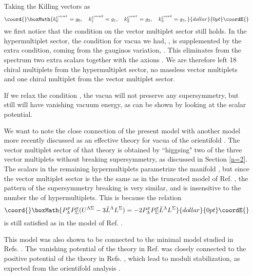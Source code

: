 \documentclass[a4paper,12pt]{article}
\begin{document}
Taking the Killing vectors as
$$\coord{}\boxMath{k^{C^{m=1}}_0 =g_0, \quad k^{C^{m=2}}_1 =g_1, \quad k^{C^{a=1}}_2 =g_2, \quad k^{C^{a=2}}_3
=g_3,}{dollar}{0pt}\coordE{}$$ we first notice that the condition on the vector multiplet
sector \coordHE{} still holds. In
the hypermultiplet sector, the condition for \coordHE{} vacua we had,
\coordHE{}, is supplemented by the extra condition, coming
from the gauginos variation, \coordHE{}. This eliminates from
the spectrum two extra scalars \coordHE{} together with the
axions \coordHE{}. We are therefore left 18 chiral multiplets
from the hypermultiplet sector, no massless vector multiplets and
one chiral multiplet from the \coordHE{} vector multiplet sector.

If we relax the condition \coordHE{}, the vacua will not
preserve any supersymmetry, but still will have vanishing vacuum
energy, as can be shown by looking at the scalar potential.

We want to note the close connection of the present \coordHE{} model
with another \coordHE{} model more recently discussed as an effective
theory for \coordHE{} vacua of the \coordHE{} orientifold
\cite{adflq}. The vector multiplet sector of that theory is
obtained by ``higgsing" two of the three vector multiplets without
breaking \coordHE{} supersymmetry, as discussed in Section \ref{n=2}.
The scalars in the remaining hypermultiplets parametrize the
manifold \coordHE{}, but since the
vector multiplet sector is the the same as in the \coordHE{}
truncated model of Ref. \cite{adflq}, the pattern of the
supersymmetry breaking is very similar, and is insensitive to the
number the of hypermultiplets. This is because the relation
$$\coord{}\boxMath{P_\Lambda^xP_\Sigma^x(U^{\Lambda\Sigma}-3\bar{L}^\Lambda
L^\Sigma)=-2P_\Lambda^xP_\Sigma^x\bar{L}^\Lambda L^\Sigma}{dollar}{0pt}\coordE{}$$ is
still satisfied as in the model of Ref. \cite{adflq}.





 This model
was also shown to be connected to the minimal \coordHE{} model studied
in Refs. \cite{cgp,fgp}. The vanishing potential of the theory in
Ref. \cite{adflq} was closely connected to the positive potential
of the theory in Refs. \cite{cgp,fgp}, which lead to moduli
stabilization, as expected from the \coordHE{} orientifold
analysis \cite{gkp,fp,kst,lo,fm,kstt}.
\end{document}
